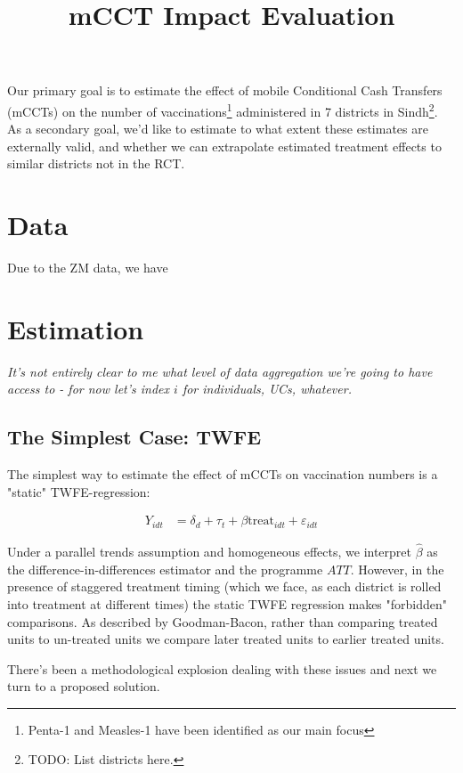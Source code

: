 \documentclass{article}
\title{mCCT Impact Evaluation}
\begin{document}
\maketitle


Our primary goal is to estimate the effect of mobile Conditional Cash Transfers (mCCTs)
on the number of vaccinations\footnote{Penta-1 and Measles-1 have been identified as 
our main focus} administered in 7 districts in Sindh\footnote{TODO: List 
districts here.}. As a secondary goal, we'd like to estimate to what extent these 
estimates are externally valid, and whether we can extrapolate estimated treatment 
effects to similar districts not in the RCT. 


\section{Data}
Due to the ZM data, we have 



\section{Estimation}


\textit{It's not entirely clear to me what level of data aggregation we're going to have 
access to - for now let's index $i$ for individuals, UCs, whatever.}


\subsection*{The Simplest Case: TWFE}
The simplest way to estimate the effect of mCCTs on vaccination numbers is a 
"static" TWFE-regression:


\begin{align*}
   Y_{idt} &= \delta_d + \tau_t + \beta \text{treat}_{idt} + \varepsilon_{idt} 
\end{align*}

Under a parallel trends assumption and homogeneous effects, we interpret $\hat{\beta}$ as the difference-in-differences estimator 
and the programme $ATT$. However, in the presence of staggered treatment timing 
(which we face, as each district is rolled into treatment at different times) the 
static TWFE regression makes "forbidden" comparisons. As described by Goodman-Bacon, rather than comparing treated 
units to un-treated units we compare later treated units to earlier treated units.

There's been a methodological explosion dealing with these issues and next we 
turn to a proposed solution.
\end{document}

